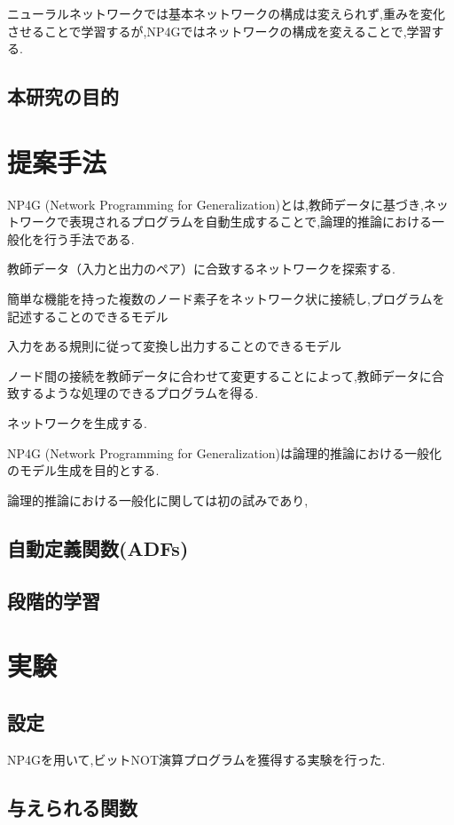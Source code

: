 \documentclass[exploratorypaper]{jsaiart} %
\begin{document}
ニューラルネットワークでは基本ネットワークの構成は変えられず,重みを変化させることで学習するが,NP4Gではネットワークの構成を変えることで,学習する.
\subsection{本研究の目的}


\section{提案手法}
NP4G (Network Programming for Generalization)とは,教師データに基づき,ネットワークで表現されるプログラムを自動生成することで,論理的推論における一般化を行う手法である.

教師データ（入力と出力のペア）に合致するネットワークを探索する.

簡単な機能を持った複数のノード素子をネットワーク状に接続し,プログラムを記述することのできるモデル

入力をある規則に従って変換し出力することのできるモデル

ノード間の接続を教師データに合わせて変更することによって,教師データに合致するような処理のできるプログラムを得る.

ネットワークを生成する.

NP4G (Network Programming for Generalization)は論理的推論における一般化のモデル生成を目的とする.

論理的推論における一般化に関しては初の試みであり,
\subsection{自動定義関数(ADFs)}

\subsection{段階的学習}

\section{実験}
\subsection{設定}
NP4Gを用いて,ビットNOT演算プログラムを獲得する実験を行った.

\subsection{与えられる関数}
\end{document}

